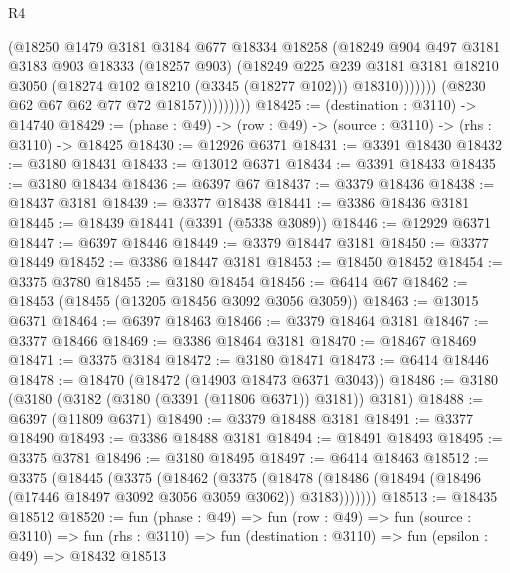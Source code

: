 \begin{lexlean}{R4}
\begin{coremodule}
                            (@18250
                              @1479
                              @3181
                              @3184
                              @677
                              @18334
                              @18258
                              (@18249
                                @904
                                @497
                                @3181
                                @3183
                                @903
                                @18333
                                (@18257 @903)
                                (@18249
                                  @225
                                  @239
                                  @3181
                                  @3181
                                  @18210
                                  @3050
                                  (@18274 @102 @18210 (@3345 (@18277 @102)))
                                  @18310)))))))
                    (@8230 @62 @67 @62 @77 @72 @18157)))))))))
@18425 := (destination : @3110) -> @14740
@18429 := (phase : @49) -> (row : @49) -> (source : @3110) -> (rhs : @3110) -> @18425
@18430 := @12926 @6371
@18431 := @3391 @18430
@18432 := @3180 @18431
@18433 := @13012 @6371
@18434 := @3391 @18433
@18435 := @3180 @18434
@18436 := @6397 @67
@18437 := @3379 @18436
@18438 := @18437 @3181
@18439 := @3377 @18438
@18441 := @3386 @18436 @3181
@18445 := @18439 @18441 (@3391 (@5338 @3089))
@18446 := @12929 @6371
@18447 := @6397 @18446
@18449 := @3379 @18447 @3181
@18450 := @3377 @18449
@18452 := @3386 @18447 @3181
@18453 := @18450 @18452
@18454 := @3375 @3780
@18455 := @3180 @18454
@18456 := @6414 @67
@18462 := @18453 (@18455 (@13205 @18456 @3092 @3056 @3059))
@18463 := @13015 @6371
@18464 := @6397 @18463
@18466 := @3379 @18464 @3181
@18467 := @3377 @18466
@18469 := @3386 @18464 @3181
@18470 := @18467 @18469
@18471 := @3375 @3184
@18472 := @3180 @18471
@18473 := @6414 @18446
@18478 := @18470 (@18472 (@14903 @18473 @6371 @3043))
@18486 := @3180 (@3180 (@3182 (@3180 (@3391 (@11806 @6371)) @3181)) @3181)
@18488 := @6397 (@11809 @6371)
@18490 := @3379 @18488 @3181
@18491 := @3377 @18490
@18493 := @3386 @18488 @3181
@18494 := @18491 @18493
@18495 := @3375 @3781
@18496 := @3180 @18495
@18497 := @6414 @18463
@18512 := @3375
    (@18445
      (@3375
        (@18462
          (@3375
            (@18478 (@18486 (@18494 (@18496 (@17446 @18497 @3092 @3056 @3059 @3062)) @3183)))))))
@18513 := @18435 @18512
@18520 := fun (phase : @49) =>
  fun (row : @49) =>
  fun (source : @3110) =>
  fun (rhs : @3110) => fun (destination : @3110) => fun (epsilon : @49) => @18432 @18513

\end{coremodule}
\end{lexlean}
